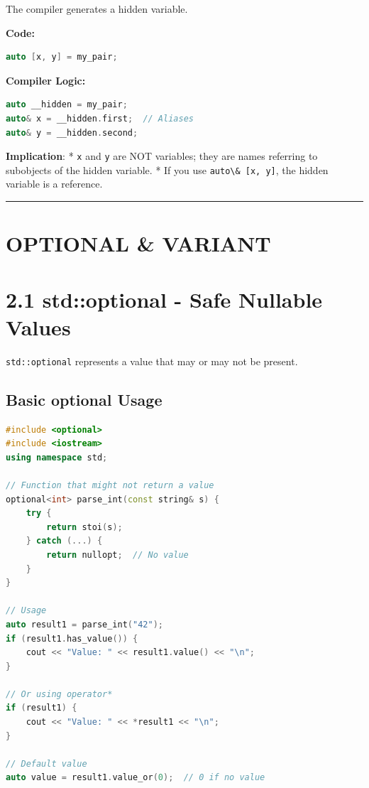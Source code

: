 The compiler generates a hidden variable.

\textbf{Code:}

\begin{lstlisting}[language={C++}]
auto [x, y] = my_pair;
\end{lstlisting}

\textbf{Compiler Logic:}

\begin{lstlisting}[language={C++}]
auto __hidden = my_pair;
auto& x = __hidden.first;  // Aliases
auto& y = __hidden.second;
\end{lstlisting}

\textbf{Implication}: * \passthrough{\lstinline!x!} and
\passthrough{\lstinline!y!} are NOT variables; they are names referring
to subobjects of the hidden variable. * If you use
\passthrough{\lstinline!auto\& [x, y]!}, the hidden variable is a
reference.

\begin{center}\rule{0.5\linewidth}{0.5pt}\end{center}

\hypertarget{optional-variant}{%
\section{OPTIONAL \& VARIANT}\label{optional-variant}}

\hypertarget{stdoptional---safe-nullable-values}{%
\section{2.1 std::optional - Safe Nullable
Values}\label{stdoptional---safe-nullable-values}}

\passthrough{\lstinline!std::optional!} represents a value that may or
may not be present.

\hypertarget{basic-optional-usage}{%
\subsection{Basic optional Usage}\label{basic-optional-usage}}

\begin{lstlisting}[language={C++}]
#include <optional>
#include <iostream>
using namespace std;

// Function that might not return a value
optional<int> parse_int(const string& s) {
    try {
        return stoi(s);
    } catch (...) {
        return nullopt;  // No value
    }
}

// Usage
auto result1 = parse_int("42");
if (result1.has_value()) {
    cout << "Value: " << result1.value() << "\n";
}

// Or using operator*
if (result1) {
    cout << "Value: " << *result1 << "\n";
}

// Default value
auto value = result1.value_or(0);  // 0 if no value
\end{lstlisting}

